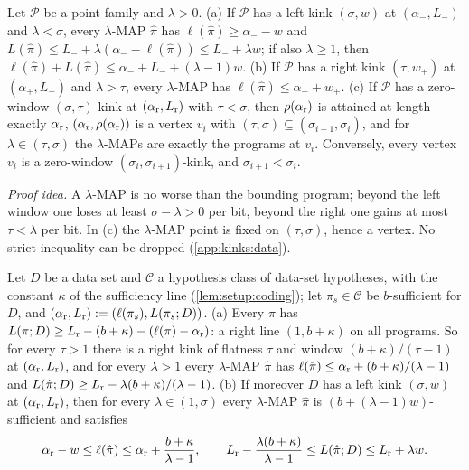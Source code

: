 \begin{corollary}\label{cor:kink:locate}
Let $\mathcal P$ be a point family and $\lambda>0$.
(a) If $\mathcal P$ has a left kink $(\sigma,w)$ at $(\alpha_-,L_-)$ and $\lambda<\sigma$, every $\lambda$-MAP $\hat\pi$ has $\ell(\hat\pi)\ge\alpha_--w$ and $L(\hat\pi)\le L_-+\lambda(\alpha_--\ell(\hat\pi))\le L_-+\lambda w$; if also $\lambda\ge1$, then $\ell(\hat\pi)+L(\hat\pi)\le\alpha_-+L_-+(\lambda-1)w$.
(b) If $\mathcal P$ has a right kink $(\tau,w_+)$ at $(\alpha_+,L_+)$ and $\lambda>\tau$, every $\lambda$-MAP has $\ell(\hat\pi)\le\alpha_++w_+$.
(c) If $\mathcal P$ has a zero-window $(\sigma,\tau)$-kink at $(\alpha_{\rm r},L_{\rm r})$ with $\tau<\sigma$, then $\rho(\alpha_{\rm r})$ is attained at length exactly $\alpha_{\rm r}$, $(\alpha_{\rm r},\rho(\alpha_{\rm r}))$ is a vertex $v_i$ with $(\tau,\sigma)\subseteq(\sigma_{i+1},\sigma_i)$, and for $\lambda\in(\tau,\sigma)$ the $\lambda$-MAPs are exactly the programs at $v_i$. Conversely, every vertex $v_i$ is a zero-window $(\sigma_i,\sigma_{i+1})$-kink, and $\sigma_{i+1}<\sigma_i$.
\end{corollary}

\emph{Proof idea.} A $\lambda$-MAP is no worse than the bounding program; beyond the left window one loses at least $\sigma-\lambda>0$ per bit, beyond the right one gains at most $\tau<\lambda$ per bit. In (c) the $\lambda$-MAP point is fixed on $(\tau,\sigma)$, hence a vertex. No strict inequality can be dropped (\cref{app:kinks:data}).

\begin{corollary}\label{cor:kink:split}
Let $D$ be a data set and $\mathcal C$ a hypothesis class of data-set hypotheses, with the constant $\kappa$ of the sufficiency line (\cref{lem:setup:coding}); let $\pi_s\in\mathcal C$ be $b$-sufficient for $D$, and $(\alpha_{\rm r},L_{\rm r}):=(\ell(\pi_s),L(\pi_s;D))$.
(a) Every $\pi$ has $L(\pi;D)\ge L_{\rm r}-(b+\kappa)-(\ell(\pi)-\alpha_{\rm r})$: a right line $(1,b+\kappa)$ on all programs. So for every $\tau>1$ there is a right kink of flatness $\tau$ and window $(b+\kappa)/(\tau-1)$ at $(\alpha_{\rm r},L_{\rm r})$, and for every $\lambda>1$ every $\lambda$-MAP $\hat\pi$ has $\ell(\hat\pi)\le\alpha_{\rm r}+(b+\kappa)/(\lambda-1)$ and $L(\hat\pi;D)\ge L_{\rm r}-\lambda(b+\kappa)/(\lambda-1)$.
(b) If moreover $D$ has a left kink $(\sigma,w)$ at $(\alpha_{\rm r},L_{\rm r})$, then for every $\lambda\in(1,\sigma)$ every $\lambda$-MAP $\hat\pi$ is $(b+(\lambda-1)w)$-sufficient and satisfies
\[
\alpha_{\rm r}-w\le\ell(\hat\pi)\le\alpha_{\rm r}+\frac{b+\kappa}{\lambda-1},\qquad L_{\rm r}-\frac{\lambda(b+\kappa)}{\lambda-1}\le L(\hat\pi;D)\le L_{\rm r}+\lambda w.
\]
\end{corollary}

